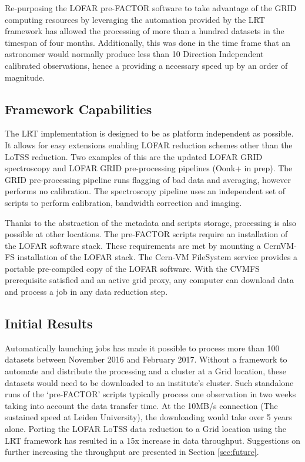 Re-purposing the LOFAR pre-FACTOR software to take advantage of the GRID computing resources by leveraging the automation provided by the LRT framework has allowed the processing of more than a hundred datasets in the timespan of four months. Additionally, this was done in the time frame that an astronomer would normally produce less than 10 Direction Independent calibrated observations, hence a providing a necessary speed up by an order of magnitude.


\subsection{Framework Capabilities}\label{sec:capabilities}

The LRT implementation is designed to be as platform independent as possible. It allows for easy extensions enabling LOFAR reduction schemes other than the LoTSS reduction. Two examples of this are the updated LOFAR GRID spectroscopy and LOFAR GRID pre-processing pipelines (Oonk+ in prep). The GRID pre-processing pipeline runs flagging of bad data and averaging, however performs no calibration. The spectroscopy pipeline uses an independent set of scripts to perform calibration,  bandwidth correction and imaging. 

Thanks to the abstraction of the metadata and scripts storage, processing is also possible at other locations. The pre-FACTOR scripts require an installation of the LOFAR software stack\cite{lofar_stack}. These requirements are met by mounting a CernVM-FS\cite{cvmfs2008}\cite{softdrive} installation of the LOFAR stack. The Cern-VM FileSystem service provides a portable pre-compiled copy of the LOFAR software.  With the CVMFS prerequisite satisfied and an active grid proxy, any computer can download data and process a job in any data reduction step. 


\subsection{Initial Results}\label{sec:performance_results}

Automatically launching jobs has made it possible to process more than 100 datasets between November 2016 and February 2017. Without a framework to automate and distribute the processing and a cluster at a Grid location, these datasets would need to be downloaded to an institute's cluster. Such standalone runs of the `pre-FACTOR' scripts typically process one observation in two weeks taking into account the data transfer time.  At the 10MB/s connection (The sustained speed at Leiden University), the downloading would take over 5 years alone. Porting the LOFAR LoTSS data reduction to a Grid location using the LRT framework has resulted in a 15x increase in data throughput. Suggestions on further increasing the throughput are presented in Section \ref{sec:future}.
 
